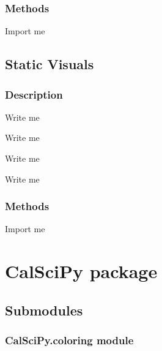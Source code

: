 \documentclass[letterpaper,10pt,english]{sphinxmanual}
\begin{document}
\subsection{Methods}
\label{\detokenize{Sub-Packages:id12}}
\begin{DUlineblock}{0em}
\item[] Import me
\end{DUlineblock}


\section{Static Visuals}
\label{\detokenize{Sub-Packages:static-visuals}}\label{\detokenize{Sub-Packages:static-visuals-module}}

\subsection{Description}
\label{\detokenize{Sub-Packages:id13}}
\begin{DUlineblock}{0em}
\item[] Write me
\item[] Write me
\item[] Write me
\item[] Write me
\end{DUlineblock}


\subsection{Methods}
\label{\detokenize{Sub-Packages:id14}}
\begin{DUlineblock}{0em}
\item[] Import me
\end{DUlineblock}

\sphinxstepscope


\chapter{CalSciPy package}
\label{\detokenize{CalSciPy:calscipy-package}}\label{\detokenize{CalSciPy::doc}}

\section{Submodules}
\label{\detokenize{CalSciPy:submodules}}
\sphinxstepscope


\subsection{CalSciPy.coloring module}
\label{\detokenize{CalSciPy.coloring:module-CalSciPy.coloring}}\label{\detokenize{CalSciPy.coloring:calscipy-coloring-module}}\label{\detokenize{CalSciPy.coloring::doc}}
\sphinxstepscope
\end{document}
